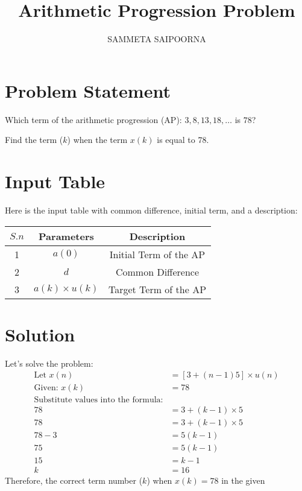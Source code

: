 \documentclass[12pt]{article}
\title{Arithmetic Progression Problem}
\author{SAMMETA SAIPOORNA}
\date{}
\newcommand{\initialterm}{3}
\newcommand{\commondifference}{5}
\newcommand{\targetterm}{78}
\begin{document}
\maketitle

\section*{Problem Statement}
Which term of the arithmetic progression (AP): \(3, 8, 13, 18, \ldots\) is \(78\)? 

Find the term (\(k\)) when the term \(x(k)\) is equal to 78.

\section{Input Table}
Here is the input table with common difference, initial term, and a description:

\begin{center}
\begin{tabular}{|c|c|c|}
  \hline
  \(S.n\) & Parameters & Description \\
  \hline
  1 & \(a(0)\) & Initial Term of the AP\\
  \hline
  2 & \(d\) & Common Difference \\
  \hline
  3 & \(a(k) \times u(k)\) & Target Term of the AP\\
  \hline
\end{tabular}
\end{center}

\section{Solution}
Let's solve the problem:
\begin{align*}
\text{Let } x(n) &= [\initialterm + (n-1)\commondifference] \times u(n) \\
\text{Given: } x(k) &= \targetterm \\
\text{Substitute values into the formula:} \\
\targetterm &= \initialterm + (k-1) \times \commondifference \\
\targetterm &= 3 + (k-1) \times 5 \\
\targetterm - 3 &= 5(k-1) \\
75 &= 5(k-1) \\
15 &= k-1 \\
k &= 16
\end{align*}
Therefore, the correct term number (\(k\)) when \(x(k) = 78\) in the given 
\end{document}
